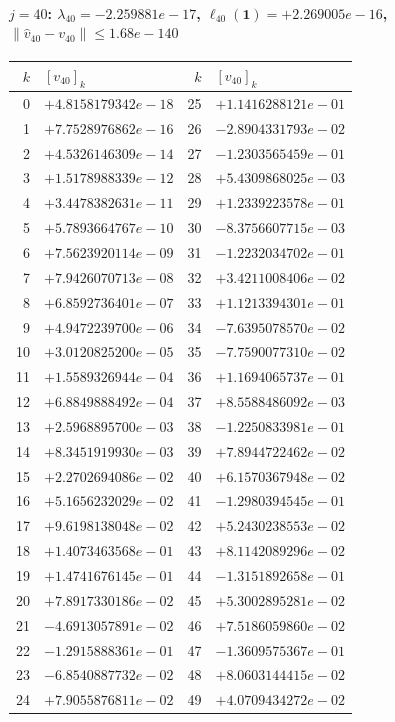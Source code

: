 \documentclass[11pt]{article}
\begin{document}
\paragraph{$j = 40$: $\lambda_{40} = -2.259881e-17$, \quad $\ell_{40}(\mathbf{1}) = +2.269005e-16$, \quad $\|\hat v_{40} - v_{40}\| \leq 1.68e-140$}
\begin{center}
{\footnotesize
\begin{tabular}{r@{\;\;}l@{\quad}r@{\;\;}l}
\toprule
$k$ & $[v_{40}]_k$ & $k$ & $[v_{40}]_k$ \\
\midrule
0 & $+4.8158179342e-18$ & 25 & $+1.1416288121e-01$ \\
1 & $+7.7528976862e-16$ & 26 & $-2.8904331793e-02$ \\
2 & $+4.5326146309e-14$ & 27 & $-1.2303565459e-01$ \\
3 & $+1.5178988339e-12$ & 28 & $+5.4309868025e-03$ \\
4 & $+3.4478382631e-11$ & 29 & $+1.2339223578e-01$ \\
5 & $+5.7893664767e-10$ & 30 & $-8.3756607715e-03$ \\
6 & $+7.5623920114e-09$ & 31 & $-1.2232034702e-01$ \\
7 & $+7.9426070713e-08$ & 32 & $+3.4211008406e-02$ \\
8 & $+6.8592736401e-07$ & 33 & $+1.1213394301e-01$ \\
9 & $+4.9472239700e-06$ & 34 & $-7.6395078570e-02$ \\
10 & $+3.0120825200e-05$ & 35 & $-7.7590077310e-02$ \\
11 & $+1.5589326944e-04$ & 36 & $+1.1694065737e-01$ \\
12 & $+6.8849888492e-04$ & 37 & $+8.5588486092e-03$ \\
13 & $+2.5968895700e-03$ & 38 & $-1.2250833981e-01$ \\
14 & $+8.3451919930e-03$ & 39 & $+7.8944722462e-02$ \\
15 & $+2.2702694086e-02$ & 40 & $+6.1570367948e-02$ \\
16 & $+5.1656232029e-02$ & 41 & $-1.2980394545e-01$ \\
17 & $+9.6198138048e-02$ & 42 & $+5.2430238553e-02$ \\
18 & $+1.4073463568e-01$ & 43 & $+8.1142089296e-02$ \\
19 & $+1.4741676145e-01$ & 44 & $-1.3151892658e-01$ \\
20 & $+7.8917330186e-02$ & 45 & $+5.3002895281e-02$ \\
21 & $-4.6913057891e-02$ & 46 & $+7.5186059860e-02$ \\
22 & $-1.2915888361e-01$ & 47 & $-1.3609575367e-01$ \\
23 & $-6.8540887732e-02$ & 48 & $+8.0603144415e-02$ \\
24 & $+7.9055876811e-02$ & 49 & $+4.0709434272e-02$ \\
\bottomrule
\end{tabular}
}
\end{center}
\end{document}
